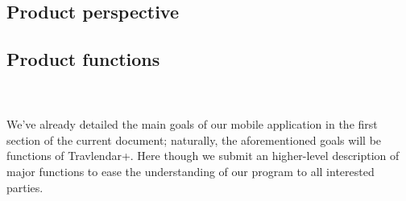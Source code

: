 \subsection{Product perspective}
			

			
		\subsection{Product functions}
		
		\hfill \\ \\ 
 We’ve already detailed the main goals of our mobile application in the first section of the current document; naturally, the aforementioned goals will be functions of Travlendar+.
Here though we submit an higher-level description of major functions to ease the understanding of our program to all interested parties.\\
		
	

